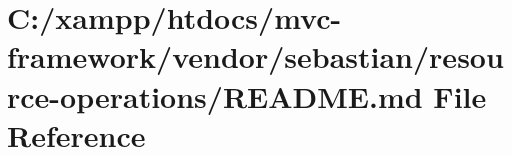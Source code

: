 \hypertarget{vendor_2sebastian_2resource-operations_2_r_e_a_d_m_e_8md}{}\section{C\+:/xampp/htdocs/mvc-\/framework/vendor/sebastian/resource-\/operations/\+R\+E\+A\+D\+ME.md File Reference}
\label{vendor_2sebastian_2resource-operations_2_r_e_a_d_m_e_8md}
